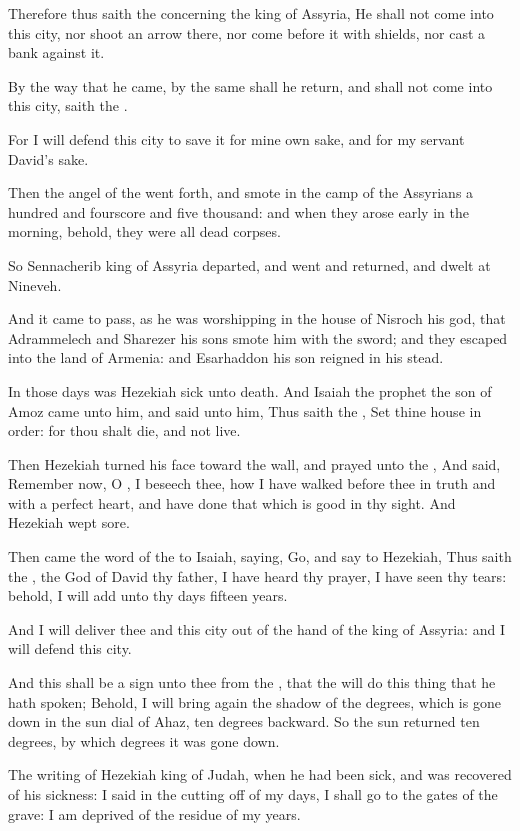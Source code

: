 \Verse Therefore thus saith the \LORD concerning the king of Assyria, He shall not come into this city, nor shoot an arrow there, nor come before it with shields, nor cast a bank against it.

\Verse By the way that he came, by the same shall he return, and shall not come into this city, saith the \LORD.

\Verse For I will defend this city to save it for mine own sake, and for my servant David's sake.

\Verse Then the angel of the \LORD went forth, and smote in the camp of the Assyrians a hundred and fourscore and five thousand: and when they arose early in the morning, behold, they were all dead corpses.

\Verse So Sennacherib king of Assyria departed, and went and returned, and dwelt at Nineveh.

\Verse And it came to pass, as he was worshipping in the house of Nisroch his god, that Adrammelech and Sharezer his sons smote him with the sword; and they escaped into the land of Armenia: and Esarhaddon his son reigned in his stead.


\Chapter
\Verse In those days was Hezekiah sick unto death. And Isaiah the prophet the son of Amoz came unto him, and said unto him, Thus saith the \LORD, Set thine house in order: for thou shalt die, and not live.

\Verse Then Hezekiah turned his face toward the wall, and prayed unto the \LORD, \Verse And said, Remember now, O \LORD, I beseech thee, how I have walked before thee in truth and with a perfect heart, and have done that which is good in thy sight. And Hezekiah wept sore.

\Verse Then came the word of the \LORD to Isaiah, saying, \Verse Go, and say to Hezekiah, Thus saith the \LORD, the God of David thy father, I have heard thy prayer, I have seen thy tears: behold, I will add unto thy days fifteen years.

\Verse And I will deliver thee and this city out of the hand of the king of Assyria: and I will defend this city.

\Verse And this shall be a sign unto thee from the \LORD, that the \LORD will do this thing that he hath spoken; \Verse Behold, I will bring again the shadow of the degrees, which is gone down in the sun dial of Ahaz, ten degrees backward. So the sun returned ten degrees, by which degrees it was gone down.

\Verse The writing of Hezekiah king of Judah, when he had been sick, and was recovered of his sickness: \Verse I said in the cutting off of my days, I shall go to the gates of the grave: I am deprived of the residue of my years.

